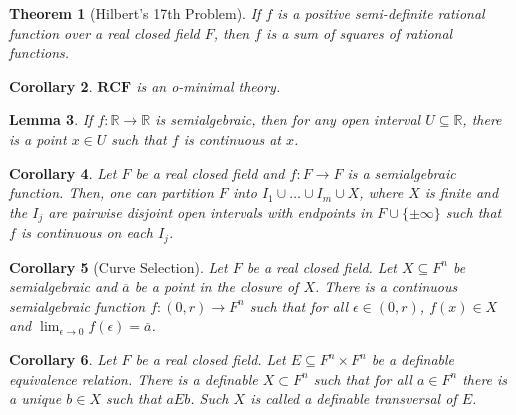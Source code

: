 \documentclass{amsart}
\newtheorem{theorem}{Theorem}[subsection]
\newtheorem{lemma}[theorem]{Lemma}
\newtheorem{corollary}[theorem]{Corollary}
\theoremstyle{definition}
\numberwithin{equation}{section}
\begin{document}
\begin{theorem}[Hilbert's 17th Problem]
    If $f$ is a positive semi-definite rational function over a real closed field $F$,
    then $f$ is a sum of squares of rational functions.
\end{theorem}

\begin{corollary}
    $\mathbf{RCF}$ is an o-minimal theory.
\end{corollary}

\begin{lemma}
    If $f:\mathbb{R} \to \mathbb{R}$ is semialgebraic,
    then for any open interval $U \subseteq \mathbb{R}$,
    there is a point $x\in U$ such that $f$ is continuous at $x$.
\end{lemma}

\begin{corollary}
    Let $F$ be a real closed field and $f: F \to F$ is a semialgebraic function.
    Then, one can partition $F$ into $I_1\cup \dots \cup I_m\cup X$,
    where $X$ is finite and the $I_j$ are pairwise disjoint open intervals with endpoints in $F\cup \{\pm\infty\}$ such that $f$ is continuous on each $I_j$.
\end{corollary}

\begin{corollary}[Curve Selection]
    Let $F$ be a real closed field.
    Let $X \subseteq F^n$ be semialgebraic and $\overline{a}$
    be a point in the closure of $X$.
    There is a continuous semialgebraic function $f:(0,r) \to F^n$
    such that for all $\epsilon\in(0,r)$, $f(x) \in X$ and $\lim_{\epsilon\to 0} f(\epsilon) = \overline{a}$.
\end{corollary}

\begin{corollary}
    Let $F$ be a real closed field.
    Let $E \subseteq F^n \times F^n$ be a definable equivalence relation.
    There is a definable $X \subset F^n$ such that for all 
    $a \in F^n$ there is a unique $b\in X$ such that $aEb$.
    Such $X$ is called a definable \emph{transversal} of $E$.
\end{corollary}
\end{document}
